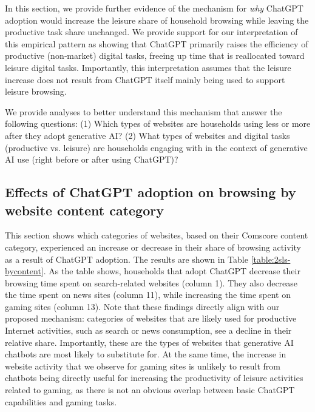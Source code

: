 \documentclass[12pt]{article}
\begin{document}
In this section, we provide further evidence of the mechanism for \textit{why} ChatGPT adoption would increase the leisure share of household browsing while leaving the productive task share unchanged. We provide support for our interpretation of this empirical pattern as showing that ChatGPT primarily raises the efficiency of productive (non‑market) digital tasks, freeing up time that is reallocated toward leisure digital tasks. Importantly, this interpretation assumes that the leisure increase does not result from ChatGPT itself mainly being used to support leisure browsing.

We provide analyses to better understand this mechanism that answer the following questions: (1) Which types of websites are households using less or more after they adopt generative AI? (2) What types of websites and digital tasks (productive vs. leisure) are households engaging with in the context of generative AI use (right before or after using ChatGPT)? 

\subsection{Effects of ChatGPT adoption on browsing by website content category}
 This section shows which categories of websites, based on their Comscore content category, experienced an increase or decrease in their share of browsing activity as a result of ChatGPT adoption. The results are shown in Table \ref{table:2sls-bycontent}. As the table shows, households that adopt ChatGPT decrease their browsing time spent on search-related websites (column 1). They also decrease the time spent on news sites (column 11), while increasing the time spent on gaming sites (column 13).  Note that these findings directly align with our proposed mechanism: categories of websites that are likely used for productive Internet activities, such as search or news consumption, see a decline in their relative share. Importantly, these are the types of websites that generative AI chatbots are most likely to substitute for.  At the same time, the increase in website activity that we observe for gaming sites is unlikely to result from chatbots being directly useful for increasing the productivity of leisure activities related to gaming, as there is not an obvious overlap between basic ChatGPT capabilities and gaming tasks.
 
\end{document}
